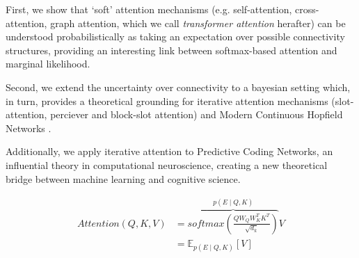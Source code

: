 \documentclass{article}
\theoremstyle{plain}
\theoremstyle{definition}
\theoremstyle{remark}
\begin{document}



First, we show that `soft' attention mechanisms (e.g. self-attention, cross-attention, graph attention, which we call \textit{transformer attention} herafter) can be understood probabilistically as taking an expectation over possible connectivity structures, providing an interesting link between softmax-based attention and marginal likelihood.

Second, we extend the uncertainty over connectivity to a bayesian setting which, in turn, provides a theoretical grounding for iterative attention mechanisms (slot-attention, perciever and block-slot attention) \cite{locatello_object-centric_2020, singh_neural_2022, jaegle_perceiver_2021} and Modern Continuous Hopfield Networks \cite{ramsauer_hopfield_2021}. 

Additionally, we apply iterative attention to Predictive Coding Networks, 
 an influential theory in computational neuroscience, creating a new theoretical bridge between machine learning and cognitive science.

\begin{equation*}
    \begin{split}
        Attention(Q, K, V) &= \overbrace{softmax(\frac{QW_{Q}W_K^TK^T}{\sqrt{d_k}})}^\text{$p(E \mid Q, K)$}V \\
        &= \mathbb{E}_{p(E\mid Q, K)}[V]
    \end{split}
\end{equation*}
\end{document}
